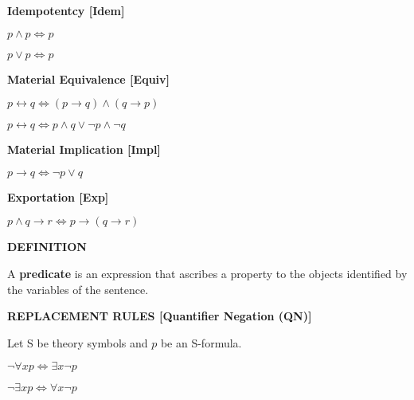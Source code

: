 \documentclass[12pt, a4paper]{article}
\begin{document}
\begin{flushleft}
\begin{description}
    \item \bullet \textbf{ Idempotentcy [Idem] }\par\hspace{15mm}
    $p\wedge p\Leftrightarrow p$\par\hspace{15mm}
    $p\vee p\Leftrightarrow p$
    
    \item \bullet \textbf{ Material Equivalence [Equiv] }\par\hspace{15mm}
    $p\leftrightarrow q\Leftrightarrow(p\to q)\wedge(q\to p)$\par\hspace{15mm}
    $p\leftrightarrow q\Leftrightarrow p\wedge q\vee\neg p\wedge\neg q$
    
    \item \bullet \textbf{ Material Implication [Impl] }\par\hspace{15mm}
    $p\to q\Leftrightarrow\neg p\vee q$\par\hspace{15mm}
    
    \item \bullet \textbf{ Exportation [Exp] }\par\hspace{15mm}
    $p\wedge q\to r\Leftrightarrow p\to(q\to r)$

\end{description}

\end{flushleft}

\newpage

\begin{flushleft}

\blacksquare \textbf{ DEFINITION }

\vspace{4mm}

\hspace{4mm} A \textbf{predicate} is an expression that ascribes a property to the objects identified by the variables of the sentence.\par

\end{flushleft}

\begin{flushleft}

\blacksquare \textbf{ REPLACEMENT RULES [Quantifier Negation (QN)] }

\end{flushleft}

Let S be theory symbols and $p$ be an S-formula.\par

\begin{description}

    \item \bullet $ \neg\forall xp\Leftrightarrow \exists x\neg p$
    
    \item \bullet $ \neg\exists xp\Leftrightarrow \forall x\neg p$

\end{description}
\end{document}
